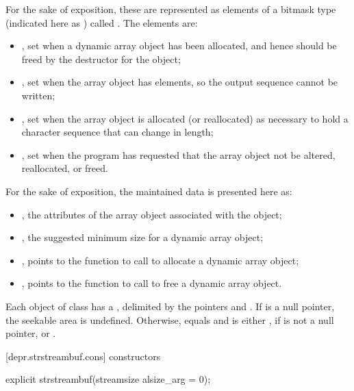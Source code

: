 \pnum
\enternote
For the sake of exposition, these are represented as elements of a bitmask type
(indicated here as ) called .
The elements are:
\begin{itemize}
\item
{}, set when a dynamic array object has been
allocated, and hence should be freed by the destructor for the
 object;
\item
{}, set when the array object has
 elements, so the output sequence cannot be written;
\item
{}, set when the array object is allocated
(or reallocated)
as necessary to hold a character sequence that can change in length;
\item
{}, set when the program has requested that the
array object not be altered, reallocated, or freed.
\end{itemize}
\exitnote

\pnum
\enternote
For the sake of exposition, the maintained data is presented here as:
\begin{itemize}
\item
{}, the attributes of the array object
associated with the  object;
\item
{}, the suggested minimum size for a
dynamic array object;
\item
{}, points to the function
to call to allocate a dynamic array object;
\item
{}, points to the function to
call to free a dynamic array object.
\end{itemize}
\exitnote

\pnum
Each object of class
has a
,
delimited by the pointers  and .
If  is a null pointer, the seekable area is undefined.
Otherwise,  equals  and
 is either ,
if  is not a null pointer, or .

[depr.strstreambuf.cons]{ constructors}

%
\begin{itemdecl}
explicit strstreambuf(streamsize alsize_arg = 0);
\end{itemdecl}

